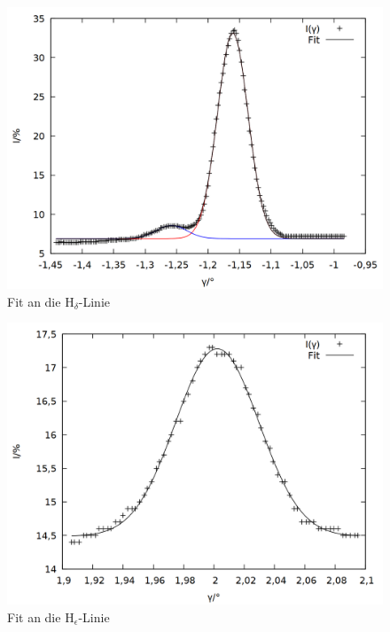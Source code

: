 \begin{figure}[h]
  \centering
  \includegraphics[width=0.75\linewidth]{data/Balmer/out_blue1.png}
  \caption{Fit an die H$_\delta$-Linie}
  \label{fig:blue1}
\end{figure}
\begin{figure}[h]
  \centering
  \includegraphics[width=0.75\linewidth]{data/Balmer/out_blue2.png}
  \caption{Fit an die H$_\epsilon$-Linie}
  \label{fig:blue2}
\end{figure}

